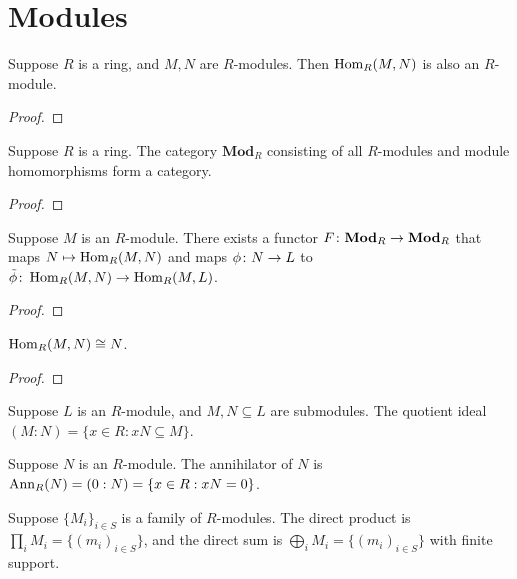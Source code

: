 \section{Modules}\label{sec:comm-modules}

\begin{proposition}
    Suppose \(R\) is a ring, and \(M,N\) are \(R\)-modules.
    Then \(\operatorname{Hom}_R(M,N)\) is also an \(R\)-module.
\end{proposition}
\begin{proof}
    
\end{proof}

\begin{proposition}
    Suppose \(R\) is a ring.
    The category \(\textbf{Mod}_R\) consisting of all \(R\)-modules
    and module homomorphisms form a category.
\end{proposition}
\begin{proof}
    
\end{proof}

\begin{proposition}
    Suppose \(M\) is an \(R\)-module.
    There exists a functor \(F\colon\textbf{Mod}_R\to\textbf{Mod}_R\)
    that maps \(N \mapsto \operatorname{Hom}_R(M,N)\)
    and maps \(\phi\colon N\to L\) to \(\tilde{\phi}\colon\operatorname{Hom}_R(M,N)\to\operatorname{Hom}_R(M,L)\).
\end{proposition}
\begin{proof}
    
\end{proof}
\begin{corollary}
    \(\operatorname{Hom}_R(M,N) \cong N\).
\end{corollary}
\begin{proof}
    
\end{proof}

\begin{definition}
    Suppose \(L\) is an \(R\)-module,
    and \(M,N \subseteq L\) are submodules.
    The quotient ideal \((M:N) = \{x \in R : xN \subseteq M\}\).
\end{definition}
\begin{definition}
    Suppose \(N\) is an \(R\)-module.
    The annihilator of \(N\) is \(\operatorname{Ann}_R(N) = (0:N) = \{x \in R : xN = 0\}\).
\end{definition}

\begin{definition}
    Suppose \({\{M_i\}}_{i \in S}\) is a family of \(R\)-modules.
    The direct product is \(\prod_i M_i = \{{(m_i)}_{i \in S}\}\),
    and the direct sum is \(\bigoplus_i M_i = \{{(m_i)_{i \in S}}\}\) with finite support.
\end{definition}

